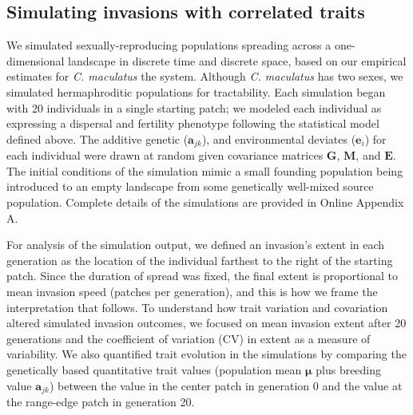 \documentclass[11pt]{article}
\newcommand{\revise}[1]{{\color{Mahogany}{#1}}}
\begin{document}
\subsection*{Simulating invasions with correlated traits}
We simulated sexually-reproducing populations spreading across a one-dimensional landscape in discrete time and discrete space, based on our empirical estimates for \textit{C. maculatus} the system.
Although \textit{C. maculatus} has two sexes, we simulated hermaphroditic populations for tractability.
Each simulation began with 20 individuals in a single starting patch; we modeled each individual as expressing a dispersal and fertility phenotype following the statistical model defined above.
The additive genetic ($\bm{a}_{jk}$), \revise{maternal ($\bm{m}_{k}$),} and environmental deviates ($\bm{e}_i$) for each individual were drawn at random given covariance matrices $\bm{G}$, $\bm{M}$, and $\bm{E}$.
The initial conditions of the simulation mimic a small founding population being introduced to an empty landscape from some genetically well-mixed source population.
Complete details of the simulations are provided in Online Appendix A.

For analysis of the simulation output, we defined an invasion's extent in each generation as the location of the individual farthest to the right of the starting patch.
Since the duration of spread was fixed, the final extent is proportional to mean invasion speed (patches per generation), and this is how we frame the interpretation that follows.
To understand how trait variation and covariation altered simulated invasion outcomes, we focused on mean invasion extent after 20 generations and the coefficient of variation (CV) in extent as a measure of variability.
We also quantified trait evolution in the simulations by comparing the genetically based quantitative trait values (population mean $\bm{\mu}$ plus breeding value $\bm{a}_{jk}$) between the value in the center patch in generation 0 and the value at the range-edge patch in generation 20.
\end{document}
